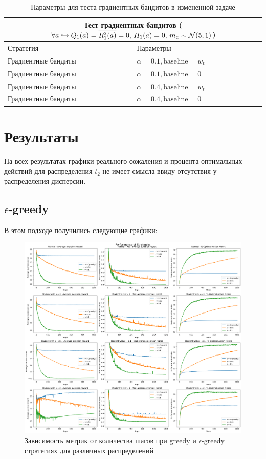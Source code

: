 \begin{table}
\centering
\renewcommand{\arraystretch}{1.3}
\begin{tabular}{ |m{4cm}|m{6cm}|  }
 \hline
 \multicolumn{2}{|c|}{Тест градиентных бандитов ($\forall a \hookrightarrow Q_1(a) = \overline{R_1^2(a)} = 0, \, H_1(a) = 0, \, m_a \sim \mathcal{N}(5,1)$)} \\
 \hline
 Стратегия & Параметры \\
 \hline
 Градиентные бандиты & $\alpha=0.1, \text{baseline} = \bar{w_t}$ \\
 \hline
 Градиентные бандиты & $\alpha=0.1, \text{baseline} = 0$ \\
 \hline
 Градиентные бандиты & $\alpha=0.4, \text{baseline} = \bar{w_t}$ \\
 \hline
 Градиентные бандиты & $\alpha=0.4, \text{baseline} = 0$ \\
 \hline
\end{tabular}
\caption{Параметры для теста градиентных бандитов в измененной задаче}
\label{table:aversion_gradient_bandits}
\end{table}

\section{Результаты}

На всех результатах графики реального сожаления и процента оптимальных действий для распределения $t_2$ не имеет смысла ввиду отсутствия у распределения дисперсии.

\subsection{$\epsilon$-greedy}

В этом подходе получились следующие графики:

\begin{figure}[ht!] %
\centering
\includegraphics[width=6in]{theory_tester/theory_images/epsilon_greedy/strat_distr.png}
\caption{Зависимость метрик от количества шагов при greedy и $\epsilon$-greedy стратегиях для различных распределений}
\label{fig:epsilon_greedy_strat_distr}
\end{figure}

